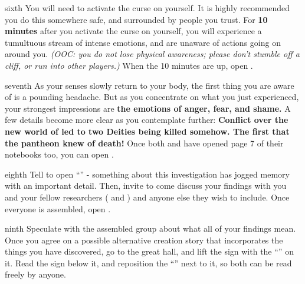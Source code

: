 \documentclass[greennotebook]{GL2020} %
\begin{document}
\begin{page}{sixth}
You will need to activate the curse on yourself. It is highly recommended you do this somewhere safe, and surrounded by people you trust. For \textbf{10 minutes} after you activate the curse on yourself, you will experience a tumultuous stream of intense emotions, and are unaware of actions going on around you. \emph{(OOC: you do not lose physical awareness; please don’t stumble off a cliff, or run into other players.)} When the 10 minutes are up, open .
\end{page}

\begin{page}{seventh}
As your senses slowly return to your body, the first thing you are aware of is a pounding headache. But as you concentrate on what you just experienced, your strongest impressions are \textbf{the emotions of anger, fear, and shame.} A few details become more clear as you contemplate further: \textbf{Conflict over the new world of \pEarth{} led to two Deities being killed somehow. The first that the pantheon knew of death!} Once both \cHeadScientist{} and \cScholarship{} have opened page 7 of their notebooks too, you can open .
\end{page}

\begin{page}{eighth}
Tell \cPrincipal{} to open \cPrincipal{\their} ``\mWOne{\MYname}'' - something about this investigation has jogged \cPrincipal{\their} memory with an important detail. Then, invite \cPrincipal{} to come discuss your findings with you and your fellow researchers ( \cScholarship{} and \cHeadScientist{}) and anyone else they wish to include.  Once everyone is assembled, open .
\end{page}

\begin{page}{ninth}
Speculate with the assembled group about what all of your findings mean. Once you agree on a possible alternative creation story that incorporates the things you have discovered, go to the great hall, and lift the sign with the ``\sCreationMythOfficial{}'' on it. Read the sign below it, and reposition the ``\sCreationMythOfficial{}'' next to it, so both can be read freely by anyone.
\end{page}

\endnotebook
\end{document}
